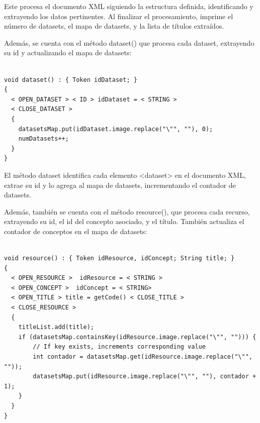 Este procesa el documento XML siguiendo la estructura definida, identificando y extrayendo los datos pertinentes. Al finalizar el procesamiento, imprime el número de datasets, el mapa de datasets, y la lista de títulos extraídos.

Además, se cuenta con el método dataset() que procesa cada dataset, extrayendo su id y actualizando el mapa de datasets:

\lstset{inputencoding=utf8/latin1}
\begin{lstlisting}

void dataset() : { Token idDataset; } 
{
  < OPEN_DATASET > < ID > idDataset = < STRING > 
  < CLOSE_DATASET >
  {
    datasetsMap.put(idDataset.image.replace("\"", ""), 0);
    numDatasets++;
  }
}

\end{lstlisting}

El método dataset identifica cada elemento <dataset> en el documento XML, extrae su id y lo agrega al mapa de datasets, incrementando el contador de datasets.

Además, también se cuenta con el método resource(), que procesa cada recurso, extrayendo su id, el id del concepto asociado, y el título. También actualiza el contador de conceptos en el mapa de datasets:

\lstset{inputencoding=utf8/latin1}
\begin{lstlisting}

void resource() : { Token idResource, idConcept; String title; } 
{
  < OPEN_RESOURCE >  idResource = < STRING > 
  < OPEN_CONCEPT >  idConcept = < STRING>
  < OPEN_TITLE > title = getCode() < CLOSE_TITLE > 
  < CLOSE_RESOURCE >
  {
    titleList.add(title);
    if (datasetsMap.containsKey(idResource.image.replace("\"", ""))) {
        // If key exists, increments corresponding value
        int contador = datasetsMap.get(idResource.image.replace("\"", ""));
        datasetsMap.put(idResource.image.replace("\"", ""), contador + 1);
    } 
  }
}

\end{lstlisting}




